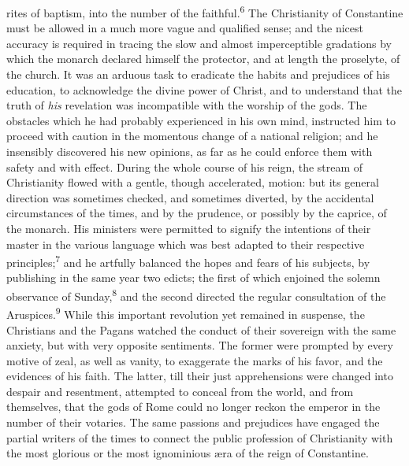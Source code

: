 rites of baptism, into the number of the faithful.\textsuperscript{6} The Christianity
of Constantine must be allowed in a much more vague and qualified
sense; and the nicest accuracy is required in tracing the slow and
almost imperceptible gradations by which the monarch declared himself
the protector, and at length the proselyte, of the church. It was an
arduous task to eradicate the habits and prejudices of his education,
to acknowledge the divine power of Christ, and to understand that the
truth of \textit{his} revelation was incompatible with the worship of the
gods. The obstacles which he had probably experienced in his own mind,
instructed him to proceed with caution in the momentous change of a
national religion; and he insensibly discovered his new opinions, as
far as he could enforce them with safety and with effect. During the
whole course of his reign, the stream of Christianity flowed with a
gentle, though accelerated, motion: but its general direction was
sometimes checked, and sometimes diverted, by the accidental
circumstances of the times, and by the prudence, or possibly by the
caprice, of the monarch. His ministers were permitted to signify the
intentions of their master in the various language which was best
adapted to their respective principles;\textsuperscript{7} and he artfully balanced the
hopes and fears of his subjects, by publishing in the same year two
edicts; the first of which enjoined the solemn observance of Sunday,\textsuperscript{8}
and the second directed the regular consultation of the Aruspices.\textsuperscript{9}
While this important revolution yet remained in suspense, the
Christians and the Pagans watched the conduct of their sovereign with
the same anxiety, but with very opposite sentiments. The former were
prompted by every motive of zeal, as well as vanity, to exaggerate the
marks of his favor, and the evidences of his faith. The latter, till
their just apprehensions were changed into despair and resentment,
attempted to conceal from the world, and from themselves, that the gods
of Rome could no longer reckon the emperor in the number of their
votaries. The same passions and prejudices have engaged the partial
writers of the times to connect the public profession of Christianity
with the most glorious or the most ignominious æra of the reign of
Constantine.



